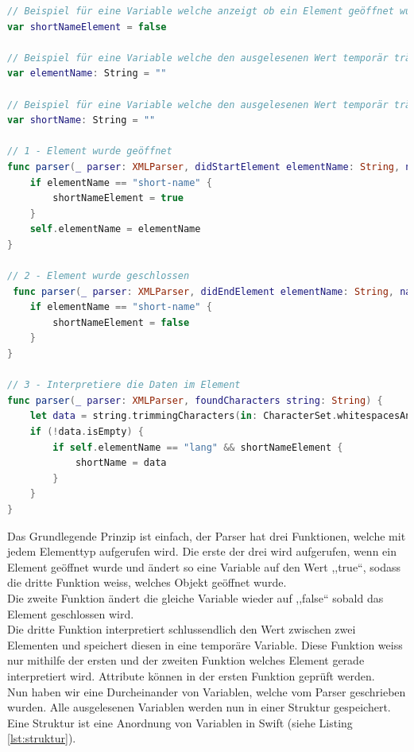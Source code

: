 \documentclass[12pt]{article}
\begin{document}
\begin{lstlisting}[language=Swift,caption={XML-Parser in Swift},label={lst:xmlParser}]
// Beispiel für eine Variable welche anzeigt ob ein Element geöffnet wurde oder nicht.
var shortNameElement = false

// Beispiel für eine Variable welche den ausgelesenen Wert temporär trägt
var elementName: String = ""

// Beispiel für eine Variable welche den ausgelesenen Wert temporär trägt und später in eine Struktur übertragen wird
var shortName: String = ""
  
// 1 - Element wurde geöffnet
func parser(_ parser: XMLParser, didStartElement elementName: String, namespaceURI: String?, qualifiedName qName: String?, attributes attributeDict: [String : String] = [:]) {
    if elementName == "short-name" {
        shortNameElement = true
    }
    self.elementName = elementName
}
    
// 2 - Element wurde geschlossen
 func parser(_ parser: XMLParser, didEndElement elementName: String, namespaceURI: String?, qualifiedName qName: String?) {
    if elementName == "short-name" {
        shortNameElement = false
    }
}
      
// 3 - Interpretiere die Daten im Element
func parser(_ parser: XMLParser, foundCharacters string: String) {
    let data = string.trimmingCharacters(in: CharacterSet.whitespacesAndNewlines)
    if (!data.isEmpty) {
        if self.elementName == "lang" && shortNameElement {
            shortName = data
        } 
    }
}
\end{lstlisting}
Das Grundlegende Prinzip ist einfach, der Parser hat drei Funktionen, welche mit jedem Elementtyp aufgerufen wird. Die erste der drei wird aufgerufen, wenn ein Element geöffnet wurde und ändert so eine Variable auf den Wert ,,true``, sodass die dritte Funktion weiss, welches Objekt geöffnet wurde. \\ Die zweite Funktion ändert die gleiche Variable wieder auf ,,false`` sobald das Element geschlossen wird. \\ Die dritte Funktion interpretiert schlussendlich den Wert zwischen zwei Elementen und speichert diesen  in eine temporäre Variable. Diese Funktion weiss nur mithilfe der ersten und der zweiten Funktion welches Element gerade interpretiert wird. Attribute können in der ersten Funktion geprüft werden. \cite{xmlParserIosCreator} \\
Nun haben wir eine Durcheinander von Variablen, welche vom Parser geschrieben wurden. Alle ausgelesenen Variablen werden nun in einer Struktur gespeichert. Eine Struktur ist eine Anordnung von Variablen in Swift (siehe Listing \ref{lst:struktur}).
\end{document}

